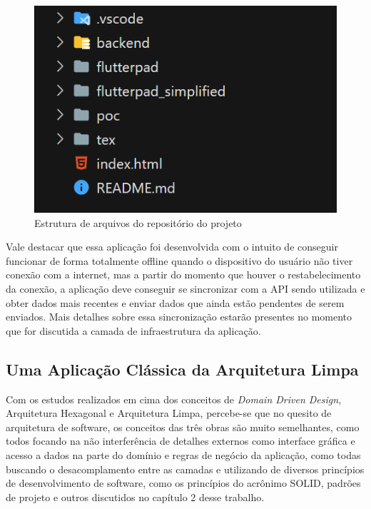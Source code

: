 \documentclass[12pt, %
openright, 
oneside, %
a4paper,    %
brazil]{facom-ufu-abntex2}
\begin{document}
\begin{figure}[ht]
    \centering
    \includegraphics[width=.50\textwidth]{figures/arch/repo_files.png}
    \caption{Estrutura de arquivos do repositório do projeto}
    \label{fig:repo_files}
\end{figure}

Vale destacar que essa aplicação foi desenvolvida com o intuito de conseguir funcionar de forma totalmente offline quando o dispositivo do usuário não tiver conexão com a internet, mas a partir do momento que houver o restabelecimento da conexão, a aplicação deve conseguir se sincronizar com a API sendo utilizada e obter dados mais recentes e enviar dados que ainda estão pendentes de serem enviados. Mais detalhes sobre essa sincronização estarão presentes no momento que for discutida a camada de infraestrutura da aplicação.


\subsection{Uma Aplicação Clássica da Arquitetura Limpa} \label{subsec:clean_arch}

Com os estudos realizados em cima dos conceitos de \textit{Domain Driven Design}, Arquitetura Hexagonal e Arquitetura Limpa, percebe-se que no quesito de arquitetura de software, os conceitos das três obras são muito semelhantes, como todos focando na não interferência de detalhes externos como interface gráfica e acesso a dados na parte do domínio e regras de negócio da aplicação, como todas buscando o desacomplamento entre as camadas e utilizando de diversos princípios de desenvolvimento de software, como os princípios do acrônimo SOLID, padrões de projeto e outros discutidos no capítulo 2 desse trabalho.
\end{document}
